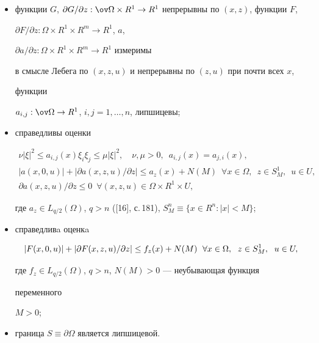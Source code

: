 \begin{itemize} 


\item[a)] функции $G$, $\partial G/\partial z:\ov\Omega\times R^1\to 


R^1$ непрерывны по $(x,z)$, функции $F$, 


$\partial F/\partial z:\Omega\times R^1\times R^m\to R^1$, $a$, 


$\partial a/\partial z:\Omega\times R^1\times R^m\to R^1$ измеримы 


в смысле Лебега по $(x,z,u)$ и непрерывны по $(z,u)$ при почти всех $x$, 


функции 


$a_{i,j}:\ov\Omega\to R^1$, $i,j=1,\dotsc,n$, липшицевы; 


\item[б)] справедливы оценки 


\begin{gather*} 


\nu|\xi|^2\le a_{i,j}(x)\xi_i\xi_j\le\mu|\xi|^2,\quad 


\nu,\mu>0,\ \; a_{i,j}(x)=a_{j,i}(x),\\ 


% 


|a(x,0,u)|+|\partial a(x,z,u)/\partial z|\le a_z(x)+N(M) 


\ \; \forall x\in\Omega,\ \; z\in S^1_M,\ \; u\in U,\\ 


% 


\partial a(x,z,u)/\partial z\le 0\ \;\forall(x,z,u)\in\Omega 


\times R^1\times U, 


\end{gather*} 


где $a_z\in L_{q/2}(\Omega)$, $q>n$ ([16], с.\,181), $S^n_M\equiv 


\{x\in R^n:|x|<M\}$; 


\item[в)] справедливa оценкa 


$$


|F(x,0,u)|+|\partial F(x,z,u)/\partial z|\le 


f_z(x)+N(M)\ \; \forall x\in\Omega,\ \; z\in S^1_M,\ \; u\in U,\\ 


$$ 


где $f_z\in L_{q/2}(\Omega)$, $q>n$, $N(M)>0$ --- неубывающая функция 


переменного 


$M>0$; 


\item[г)] граница $S\equiv\partial\Omega$ является липшицевой. 


\end{itemize} 


